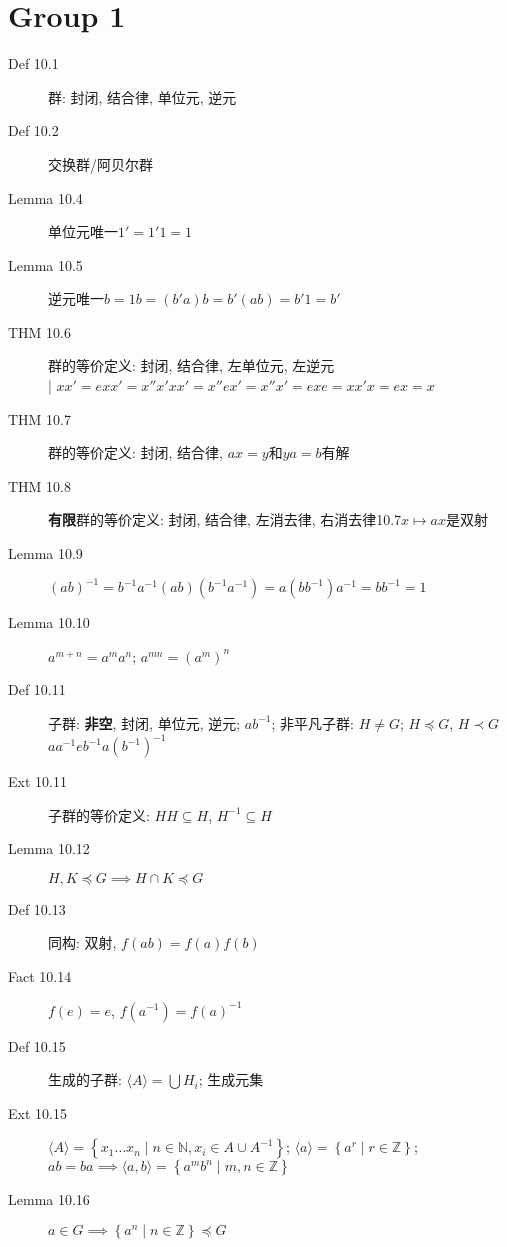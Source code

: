 \documentclass{article}
\renewcommand{\l}{\left}
\renewcommand{\r}{\right}
\begin{document}
    \section{Group 1}
    \begin{description}
        \item[Def 10.1] 群: 封闭, 结合律, 单位元, 逆元
        \item[Def 10.2] 交换群/阿贝尔群
        \item[Lemma 10.4] 单位元唯一\hfill$1' = 1'1 = 1$
        \item[Lemma 10.5] 逆元唯一\hfill$b = 1b = (b'a)b = b'(ab) = b'1 = b'$
        \item[THM 10.6] 群的等价定义: 封闭, 结合律, 左单位元, 左逆元\\
            | \hfill$xx' = exx' = x''x'xx' = x''ex' = x''x' = e$\quad$xe = xx'x = ex = x$
        \item[THM 10.7] 群的等价定义: 封闭, 结合律, $ax=y$和$ya=b$有解
        \item[THM 10.8] \textbf{有限}群的等价定义: 封闭, 结合律, 左消去律, 右消去律\hfill 10.7\quad$x \mapsto ax$是双射
        \item[Lemma 10.9] $(ab)^{-1} = b^{-1}a^{-1}$\hfill$(ab)(b^{-1}a^{-1}) = a(bb^{-1})a^{-1} = bb^{-1} = 1$
        \item[Lemma 10.10] $a^{m+n} = a^ma^n$; $a^{mn}=(a^m)^n$
        \item[Def 10.11] 子群: \textbf{非空}, 封闭, 单位元, 逆元; $ab^{-1}$; 非平凡子群: $H \ne G$; $H \preceq G$, $H \prec G$\hfill$aa^{-1}$\quad$eb^{-1}$\quad$a(b^{-1})^{-1}$
        \item[Ext 10.11] 子群的等价定义: $HH \subseteq H$, $H^{-1} \subseteq H$
        \item[Lemma 10.12] $H, K \preceq G \implies H \cap K \preceq G$
        \item[Def 10.13] 同构: 双射, $f(ab)=f(a)f(b)$
        \item[Fact 10.14] $f(e) = e$, $f(a^{-1}) = f(a)^{-1}$
        \item[Def 10.15] 生成的子群: $\langle A \rangle = \bigcup H_i$; 生成元集
        \item[Ext 10.15] $\langle A \rangle = \l\{ x_1 \dots x_n \mid n \in \mathbb N, x_i \in A \cup A^{-1} \r\}$;
            $\langle a \rangle = \l\{ a^r \mid r \in \mathbb Z \r\}$;
            $ab = ba \implies \langle a, b \rangle = \l\{ a^m b^n \mid m, n \in \mathbb Z \r\}$
        \item[Lemma 10.16] $a \in G \implies \l\{ a^n \mid n \in \mathbb Z \r\} \preceq G$

\end{description}
\end{document}
